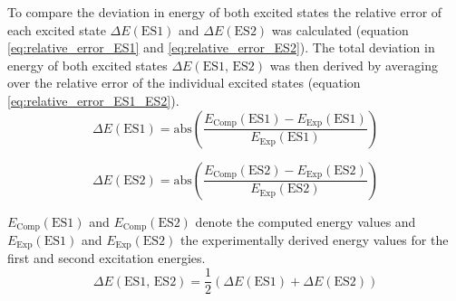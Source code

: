 \vspace{1 cm}
%
%
%
To compare the deviation in energy of both excited states the relative error of each excited state $\Delta E\left(\text{ES1}\right)$ and $\Delta E\left(\text{ES2}\right)$ was calculated (equation \ref{eq:relative_error_ES1} and \ref{eq:relative_error_ES2}). The total deviation in energy of both excited states $\Delta E\left(\text{ES1, ES2}\right)$ was then derived by averaging over the relative error of the individual excited states (equation \ref{eq:relative_error_ES1_ES2}).
%
\begin{equation}
\label{eq:relative_error_ES1}
    \Delta E\left(\text{ES1}\right) = \text{abs}\left(\frac{E_{\text{Comp}}(\text{ES1})-E_{\text{Exp}}(\text{ES1})}{E_{\text{Exp}}(\text{ES1})}\right)
\end{equation}

\begin{equation}
\label{eq:relative_error_ES2}
    \Delta E\left(\text{ES2}\right) = \text{abs}\left(\frac{E_{\text{Comp}}(\text{ES2})-E_{\text{Exp}}(\text{ES2})}{E_{\text{Exp}}(\text{ES2})}\right)
\end{equation}

$E_{\text{Comp}}(\text{ES1})$ and $E_{\text{Comp}}(\text{ES2})$ denote the computed energy values and $E_{\text{Exp}}(\text{ES1})$ and $E_{\text{Exp}}(\text{ES2})$ the experimentally derived energy values for the first and second excitation energies.
\begin{equation}
\label{eq:relative_error_ES1_ES2}
    \Delta E\left(\text{ES1, ES2}\right) = \frac{1}{2} \left(\Delta E\left(\text{ES1}\right) + \Delta E\left(\text{ES2}\right)\right)
\end{equation}




